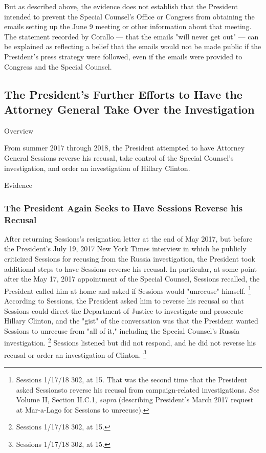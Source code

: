 But as described above, the evidence does not establish that the President intended to prevent the Special Counsel's Office or Congress from obtaining the emails setting up the June 9 meeting or other information about that meeting.
The statement recorded by Corallo — that the emails "will never get out" — can be explained as reflecting a belief that the emails would not be made public if the President's press strategy were followed, even if the emails were provided to Congress and the Special Counsel.

\subsection{The President's Further Efforts to Have the Attorney General Take Over the Investigation}

Overview

From summer 2017 through 2018, the President attempted to have Attorney General Sessions reverse his recusal, take control of the Special Counsel's investigation, and order an investigation of Hillary Clinton.

Evidence

\subsubsection{The President Again Seeks to Have Sessions Reverse his Recusal}

After returning Sessions's resignation letter at the end of May 2017, but before the President's July 19, 2017 New York Times interview in which he publicly criticized Sessions for recusing from the Russia investigation, the President took additional steps to have Sessions reverse his recusal.
In particular, at some point after the May 17, 2017 appointment of the Special Counsel, Sessions recalled, the President called him at home and asked if Sessions would "unrecuse" himself.%
\footnote{Sessions 1/17/18 302, at 15.
That was the second time that the President asked Sessionsto reverse his recusal from campaign-related investigations.
\textit{See} Volume II, Section II.C.1, \textit{supra} (describing President’s March 2017 request at Mar-a-Lago for Sessions to unrecuse).
}
According to Sessions, the President asked him to reverse his recusal so that Sessions could direct the Department of Justice to investigate and prosecute Hillary Clinton, and the "gist" of the conversation was that the President wanted Sessions to unrecuse from "all of it," including the Special Counsel's Russia investigation.%
\footnote{Sessions 1/17/18 302, at 15.}
Sessions listened but did not respond, and he did not reverse his recusal or order an investigation of Clinton.%
\footnote{Sessions 1/17/18 302, at 15.}

